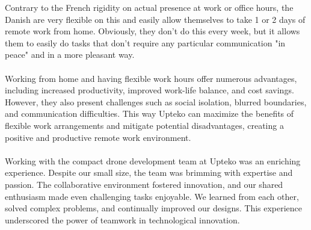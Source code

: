 Contrary to the French rigidity on actual presence at work or office hours, the Danish are very flexible on this and easily allow themselves to take 1 or 2 days of remote work from home.
Obviously, they don't do this every week, but it allows them to easily do tasks that don't require any particular communication "in peace" and in a more pleasant way.
\\ \\
Working from home and having flexible work hours offer numerous advantages, including increased productivity, improved work-life balance, and cost savings. However, they also present challenges such as social isolation, blurred boundaries, and communication difficulties. This way Upteko can maximize the benefits of flexible work arrangements and mitigate potential disadvantages, creating a positive and productive remote work environment.
\\ \\
Working with the compact drone development team at Upteko was an enriching experience. Despite our small size, the team was brimming with expertise and passion. The collaborative environment fostered innovation, and our shared enthusiasm made even challenging tasks enjoyable. We learned from each other, solved complex problems, and continually improved our designs. This experience underscored the power of teamwork in technological innovation.